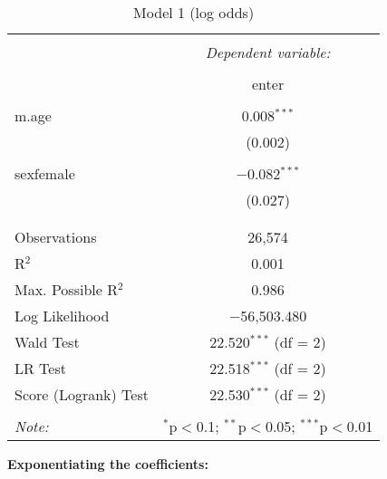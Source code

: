 \documentclass[12pt,letterpaper]{article}
\begin{document}
\begin{table}[H] \centering 
  \caption{Model 1 (log odds)} 
  \label{} 
\begin{tabular}{@{\extracolsep{5pt}}lc} 
\\[-1.8ex]\hline 
\hline \\[-1.8ex] 
 & \multicolumn{1}{c}{\textit{Dependent variable:}} \\ 
\cline{2-2} 
\\[-1.8ex] & enter \\ 
\hline \\[-1.8ex] 
 m.age & 0.008$^{***}$ \\ 
  & (0.002) \\ 
  & \\ 
 sexfemale & $-$0.082$^{***}$ \\ 
  & (0.027) \\ 
  & \\ 
\hline \\[-1.8ex] 
Observations & 26,574 \\ 
R$^{2}$ & 0.001 \\ 
Max. Possible R$^{2}$ & 0.986 \\ 
Log Likelihood & $-$56,503.480 \\ 
Wald Test & 22.520$^{***}$ (df = 2) \\ 
LR Test & 22.518$^{***}$ (df = 2) \\ 
Score (Logrank) Test & 22.530$^{***}$ (df = 2) \\ 
\hline 
\hline \\[-1.8ex] 
\textit{Note:}  & \multicolumn{1}{r}{$^{*}$p$<$0.1; $^{**}$p$<$0.05; $^{***}$p$<$0.01} \\ 
\end{tabular} 
\end{table} 

\textbf{Exponentiating the coefficients:}
 
\end{document}
